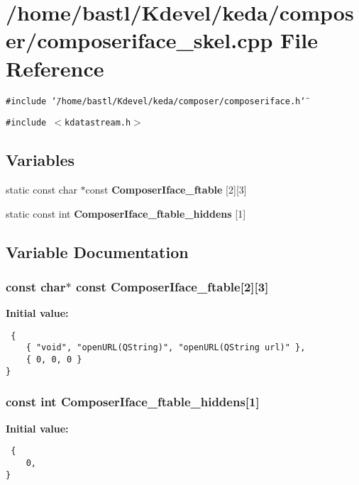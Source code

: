 \section{/home/bastl/Kdevel/keda/composer/composeriface\_\-skel.cpp File Reference}
\label{composeriface__skel_8cpp}
{\tt \#include \char`\"{}/home/bastl/Kdevel/keda/composer/composeriface.h\char`\"{}}\par
{\tt \#include $<$kdatastream.h$>$}\par
\subsection*{Variables}
\begin{CompactItemize}
\item 
static const char $\ast$const {\bf Composer\-Iface\_\-ftable} [2][3]
\item 
static const int {\bf Composer\-Iface\_\-ftable\_\-hiddens} [1]
\end{CompactItemize}


\subsection{Variable Documentation}
\subsubsection{\setlength{\rightskip}{0pt plus 5cm}const char$\ast$ const {\bf Composer\-Iface\_\-ftable}[2][3]\hspace{0.3cm}{\tt  [static]}}\label{composeriface__skel_8cpp_a173badd16c220f1cc35dd79a467f642}


{\bf Initial value:}

\footnotesize\begin{verbatim} {
    { "void", "openURL(QString)", "openURL(QString url)" },
    { 0, 0, 0 }
}
\end{verbatim}\normalsize 
{}
\subsubsection{\setlength{\rightskip}{0pt plus 5cm}const int {\bf Composer\-Iface\_\-ftable\_\-hiddens}[1]\hspace{0.3cm}{\tt  [static]}}\label{composeriface__skel_8cpp_e4db04dceb4090801a0284525a0372a9}


{\bf Initial value:}

\footnotesize\begin{verbatim} {
    0,
}
\end{verbatim}\normalsize 

